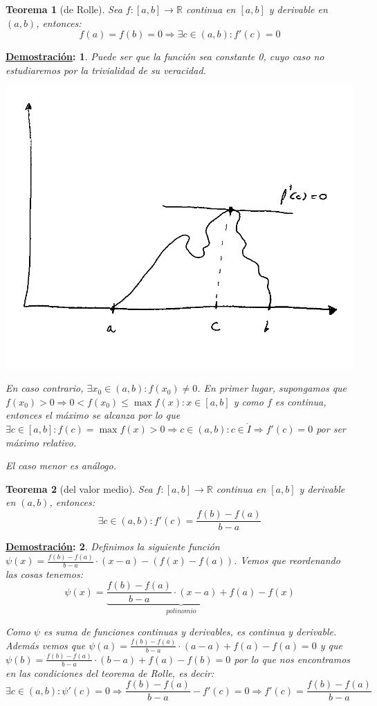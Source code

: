 \documentclass[10pt,a4paper,openright]{book}
\theoremstyle{break}
\newtheorem*{theo}{Teorema}
\newtheorem*{demo}{\underline{Demostración}:}
\begin{document}
\begin{theo}[de Rolle]
Sea $f: [a,b]\rightarrow \mathbb R$ continua en $[a,b]$ y derivable en $(a,b)$, entonces:
$$f(a)=f(b)=0\Rightarrow \exists c\in (a,b): f'(c)=0$$
\end{theo}
\begin{demo}
Puede ser que la función sea constante 0, cuyo caso no estudiaremos por la trivialidad de su veracidad.
\begin{center}
\includegraphics[scale=0.90]{Teorema de Rolle}
\end{center}
En caso contrario, $\exists x_0\in (a,b):f(x_0)\neq 0$. En primer lugar, supongamos que $f(x_0)>0\Rightarrow 0<f(x_0)\leq \max{f(x)}: x\in [a,b]$ y como $f$ es continua, entonces el máximo se alcanza por lo que $\exists c\in [a,b]: f(c)=\max{f(x)}>0\Rightarrow c\in (a,b): c\in \mathring{I}\Rightarrow f'(c) = 0$ por ser máximo relativo.

El caso menor es análogo.
\end{demo}

\begin{theo}[del valor medio]
Sea $f:[a,b]\rightarrow\mathbb R$ continua en $[a,b]$ y derivable en $(a,b)$, entonces:
$$\exists c \in (a,b): f'(c)=\frac{f(b)-f(a)}{b-a}$$
\end{theo}
\begin{demo}
Definimos la siguiente función $\psi(x)=\frac{f(b)-f(a)}{b-a}\cdot (x-a)-(f(x)-f(a))$. Vemos que reordenando las cosas tenemos:
$$\psi(x)=\underbrace{\frac{f(b)-f(a)}{b-a}\cdot (x-a)+f(a)}_{polinomio}-f(x)$$

Como $\psi$ es suma de funciones continuas y derivables, es continua y derivable. Además vemos que $\psi(a)=\frac{f(b)-f(a)}{b-a}\cdot (a-a)+f(a)-f(a)=0$ y que $\psi(b)=\frac{f(b)-f(a)}{b-a}\cdot (b-a)+f(a)-f(b)=0$ por lo que nos encontramos en las condiciones del teorema de Rolle, es decir:
$$\exists c\in (a,b): \psi'(c)=0\Rightarrow \frac{f(b)-f(a)}{b-a}-f'(c)=0\Rightarrow f'(c)=\frac{f(b)-f(a)}{b-a}$$
\end{demo}
\end{document}
